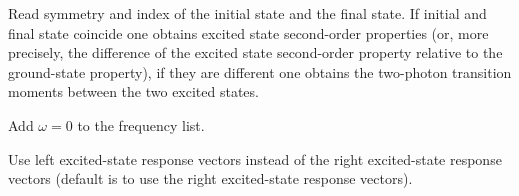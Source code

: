 \begin{description}
Read symmetry and index of the initial state and the final state.
If initial and final state coincide one obtains excited state
second-order properties (or, more precisely, the difference of the excited state second-order property relative to the ground-state property), if they are different one obtains the
two-photon transition moments between the two excited states.
 
\item[\Key{STATIC}] 
Add $\omega = 0$ to the frequency list.
 
\item[\Key{USELEF}] 
Use left excited-state response vectors instead of the right excited-state response vectors (default is to use the right excited-state
response vectors).
 
\end{description}
